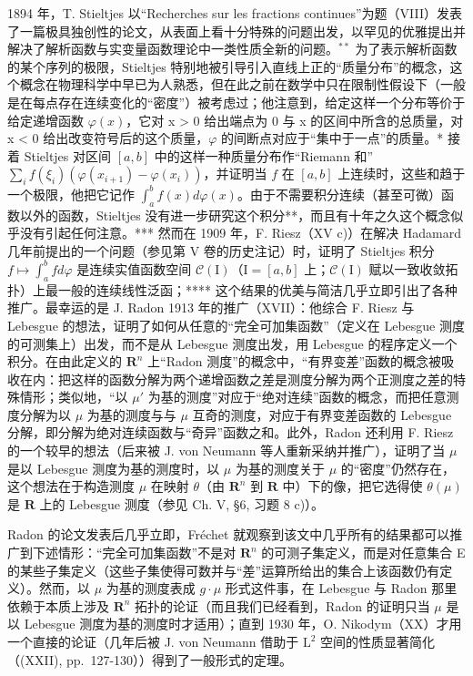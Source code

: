 1894 年，T. Stieltjes 以“Recherches sur les fractions continues”为题（VIII）发表了一篇极具独创性的论文，从表面上看十分特殊的问题出发，以罕见的优雅提出并解决了解析函数与实变量函数理论中一类性质全新的问题。\(^{**}\) 为了表示解析函数的某个序列的极限，Stieltjes 特别地被引导引入直线上正的“质量分布”的概念，这个概念在物理科学中早已为人熟悉，但在此之前在数学中只在限制性假设下（一般是在每点存在连续变化的“密度”）被考虑过；他注意到，给定这样一个分布等价于给定递增函数 \(\varphi(x)\)，它对 x \textgreater{} 0 给出端点为 0 与 x 的区间中所含的总质量，对 x < 0 给出改变符号后的这个质量，\(\varphi\) 的间断点对应于“集中于一点”的质量。* 接着 Stieltjes 对区间 \([a,b]\) 中的这样一种质量分布作“Riemann 和” \(\sum_{i} f(\xi_i)(\varphi(x_{i+1}) - \varphi(x_i))\)，并证明当 \(f\) 在 \([a,b]\) 上连续时，这些和趋于一个极限，他把它记作 \(\int_{a}^{b} f(x) d\varphi(x)\)。由于不需要积分连续（甚至可微）函数以外的函数，Stieltjes 没有进一步研究这个积分**，而且有十年之久这个概念似乎没有引起任何注意。*** 然而在 1909 年，F. Riesz（XV c)）在解决 Hadamard 几年前提出的一个问题（参见第 V 卷的历史注记）时，证明了 Stieltjes 积分 \(f \mapsto \int_{a}^{b} f d\varphi\) 是连续实值函数空间 \(\mathcal{C}(\mathrm{I})\)（\(\mathrm{I} = [a,b]\) 上；\(\mathcal{C}(\mathrm{I})\) 赋以一致收敛拓扑）上最一般的连续线性泛函；**** 这个结果的优美与简洁几乎立即引出了各种推广。最幸运的是 J. Radon 1913 年的推广（XVII）：他综合 F. Riesz 与 Lebesgue 的想法，证明了如何从任意的“完全可加集函数”（定义在 Lebesgue 测度的可测集上）出发，而不是从 Lebesgue 测度出发，用 Lebesgue 的程序定义一个积分。在由此定义的 \(\mathbf{R}^n\) 上“Radon 测度”的概念中，“有界变差”函数的概念被吸收在内：把这样的函数分解为两个递增函数之差是测度分解为两个正测度之差的特殊情形；类似地，“以 \(\mu'\) 为基的测度”对应于“绝对连续”函数的概念，而把任意测度分解为以 \(\mu\) 为基的测度与与 \(\mu\) 互奇的测度，对应于有界变差函数的 Lebesgue 分解，即分解为绝对连续函数与“奇异”函数之和。此外，Radon 还利用 F. Riesz 的一个较早的想法（后来被 J. von Neumann 等人重新采纳并推广），证明了当 \(\mu\) 是以 Lebesgue 测度为基的测度时，以 \(\mu\) 为基的测度关于 \(\mu\) 的“密度”仍然存在，这个想法在于构造测度 \(\mu\) 在映射 \(\theta\)（由 \(\mathbf{R}^n\) 到 \(\mathbf{R}\) 中）下的像，把它选得使 \(\theta(\mu)\) 是 \(\mathbf{R}\) 上的 Lebesgue 测度（参见 Ch. V, §6, 习题 8 c)）。

Radon 的论文发表后几乎立即，Fréchet 就观察到该文中几乎所有的结果都可以推广到下述情形：“完全可加集函数”不是对 \(\mathbf{R}^n\) 的可测子集定义，而是对任意集合 E 的某些子集定义（这些子集使得可数并与“差”运算所给出的集合上该函数仍有定义）。然而，以 \(\mu\) 为基的测度表成 \(g \cdot \mu\) 形式这件事，在 Lebesgue 与 Radon 那里依赖于本质上涉及 \(\mathbf{R}^n\) 拓扑的论证（而且我们已经看到，Radon 的证明只当 \(\mu\) 是以 Lebesgue 测度为基的测度时才适用）；直到 1930 年，O. Nikodym（XX）才用一个直接的论证（几年后被 J. von Neumann 借助于 \(\mathrm{L}^2\) 空间的性质显著简化（(XXII), pp.~127-130））得到了一般形式的定理。


